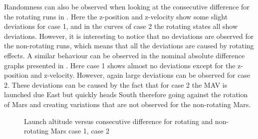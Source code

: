 \noindent
Randomness can also be observed when looking at the consecutive difference for the rotating runs in . Here the z-position and z-velocity show some slight deviations for case 1, and in the curves of case 2 the rotating states all show deviations. However, it is interesting to notice that no deviations are observed for the non-rotating runs, which means that all the deviations are caused by rotating effects. A similar behaviour can be observed in the nominal absolute difference graphs presented in . Here case 1 shows almost no deviations except for the z-position and z-velocity. However, again large deviations can be observed for case 2. These deviations can be caused by the fact that for case 2 the \ac{MAV} is launched due East but quickly heads South therefore going against the rotation of Mars and creating variations that are not observed for the non-rotating Mars.

\begin{figure}[H]
\centering
{} 
\caption{Launch altitude versus consecutive difference for rotating and non-rotating Mars \protect{} case 1,  \protect{} case 2 } 
\label{fig:launchAltitudeVsConsecutiveDifferenceCase1combinedSmall} 
\end{figure} 



